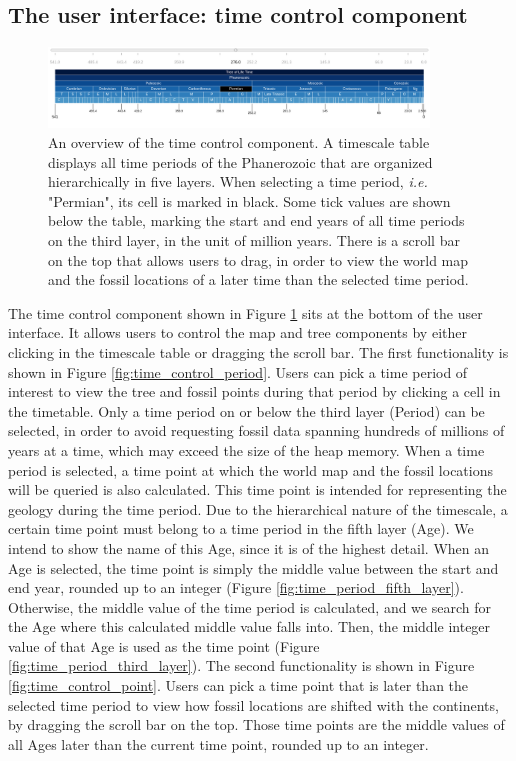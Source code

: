\documentclass[11pt, a4paper,oneside,chapterprefix=false]{scrbook}
\begin{document}
\subsection{The user interface: time control component}\label{subsec:tec_frontend_time}

\begin{figure}[h]
	\centering
	\includegraphics[width=0.9\textwidth]{figures/technical_solution/time_control/time_control_overview}
	\caption{An overview of the time control component. A timescale table displays all time periods of the Phanerozoic that are organized hierarchically in five layers. When selecting a time period, \emph{i.e.} "Permian", its cell is marked in black. Some tick values are shown below the table, marking the start and end years of all time periods on the third layer, in the unit of million years. There is a scroll bar on the top that allows users to drag, in order to view the world map and the fossil locations of a later time than the selected time period.}
	\label{fig:time_control_overview}
\end{figure}

The time control component shown in Figure \ref{fig:time_control_overview} sits at the bottom of the user interface. It allows users to control the map and tree components by either clicking in the timescale table or dragging the scroll bar. The first functionality is shown in Figure \ref{fig:time_control_period}. Users can pick a time period of interest to view the tree and fossil points during that period by clicking a cell in the timetable. Only a time period on or below the third layer (Period) can be selected, in order to avoid requesting fossil data spanning hundreds of millions of years at a time, which may exceed the size of the heap memory. When a time period is selected, a time point at which the world map and the fossil locations will be queried is also calculated. This time point is intended for representing the geology during the time period. Due to the hierarchical nature of the timescale, a certain time point must belong to a time period in the fifth layer (Age). We intend to show the name of this Age, since it is of the highest detail. When an Age is selected, the time point is simply the middle value between the start and end year, rounded up to an integer (Figure \ref{fig:time_period_fifth_layer}). Otherwise, the middle value of the time period is calculated, and we search for the Age where this calculated middle value falls into. Then, the middle integer value of that Age is used as the time point (Figure \ref{fig:time_period_third_layer}). The second functionality is shown in Figure \ref{fig:time_control_point}. Users can pick a time point that is later than the selected time period to view how fossil locations are shifted with the continents, by dragging the scroll bar on the top. Those time points are the middle values of all Ages later than the current time point, rounded up to an integer. \\
\end{document}

